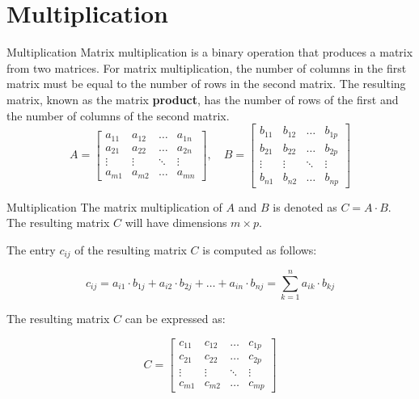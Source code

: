 \documentclass{beamer}
\begin{document}
\section{Multiplication}
\begin{frame}{Multiplication}
    \alert{Matrix multiplication} is a binary operation that produces a matrix from two matrices. For matrix multiplication, the number of columns in the first matrix must be equal to the number of rows in the second matrix. The resulting matrix, known as the matrix \textbf{product}, has the number of rows of the first and the number of columns of the second matrix.
    $$
        A = \begin{bmatrix}
            a_{11} & a_{12} & \dots  & a_{1n} \\
            a_{21} & a_{22} & \dots  & a_{2n} \\
            \vdots & \vdots & \ddots & \vdots \\
            a_{m1} & a_{m2} & \dots  & a_{mn}
        \end{bmatrix}, \quad
        B = \begin{bmatrix}
            b_{11} & b_{12} & \dots  & b_{1p} \\
            b_{21} & b_{22} & \dots  & b_{2p} \\
            \vdots & \vdots & \ddots & \vdots \\
            b_{n1} & b_{n2} & \dots  & b_{np}
        \end{bmatrix}
    $$
\end{frame}

\begin{frame}{Multiplication}
    The matrix multiplication of $A$ and $B$ is denoted as $C = A \cdot B$. The resulting matrix $C$ will have dimensions $m \times p$.

    The entry $c_{ij}$ of the resulting matrix $C$ is computed as follows:

    $$
        c_{ij} = a_{i1} \cdot b_{1j} + a_{i2} \cdot b_{2j} + \dots + a_{in} \cdot b_{nj} = \sum_{k=1}^{n} a_{ik} \cdot b_{kj}
    $$

    The resulting matrix $C$ can be expressed as:

    $$
        C = \begin{bmatrix}
            c_{11} & c_{12} & \dots  & c_{1p} \\
            c_{21} & c_{22} & \dots  & c_{2p} \\
            \vdots & \vdots & \ddots & \vdots \\
            c_{m1} & c_{m2} & \dots  & c_{mp}
        \end{bmatrix}
    $$
\end{frame}
\end{document}

